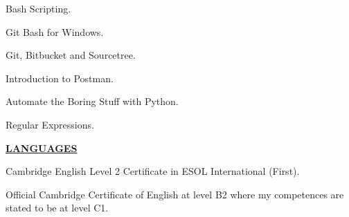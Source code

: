 \documentclass[10pt,a4paper]{altacv}
\begin{document}
{\faCertificate \color{emphasis} \hspace{2mm} Bash Scripting.}

{\faCertificate \color{emphasis} \hspace{2mm} Git Bash for Windows.}

{\faCertificate \color{emphasis} \hspace{2mm} Git, Bitbucket and Sourcetree.}

{\faCertificate \color{emphasis} \hspace{2mm} Introduction to Postman.}

{\faCertificate \color{emphasis} \hspace{2mm} Automate the Boring Stuff with Python.}

{\faCertificate \color{emphasis} \hspace{2mm} Regular Expressions.}

\begin{center}
  \underline{\textbf{LANGUAGES}}
\end{center}
{ \faCertificate \color{emphasis} \hspace{2mm} Cambridge English Level 2 Certificate in ESOL International (First).}

Official Cambridge Certificate of English at level B2 where my competences are stated to be at level C1.
\end{document}
